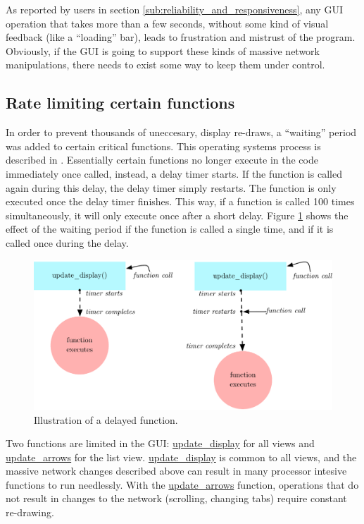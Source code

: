 As reported by users in section \ref{sub:reliability_and_responsiveness}, any GUI operation that takes more than a few seconds, without some kind of visual feedback (like a ``loading'' bar), leads to frustration and mistrust of the program. Obviously, if the GUI is going to support these kinds of massive network manipulations, there needs to exist some way to keep them under control.

	\subsection{Rate limiting certain functions} %
	\label{sub:rate_limiting_certain_functions}

In order to prevent thousands of uneccesary, display re-draws, a ``waiting'' period was added to certain critical functions. This operating systems process is described in . Essentially certain functions no longer execute in the code immediately once called, instead, a delay timer starts. If the function is called again during this delay, the delay timer simply restarts. The function is only executed once the delay timer finishes. This way, if a function is called 100 times simultaneously, it will only execute once after a short delay. Figure \ref{fig:waiting_period} shows the effect of the waiting period if the function is called a single time, and if it is called once during the delay.

\begin{figure}[ht]
	\centering
		\includegraphics[width=1\textwidth]{figures/waiting_period}
		\caption{Illustration of a delayed function.}
		\label{fig:waiting_period}
\end{figure}

Two functions are limited in the GUI: \url{update_display} for all views and \url{update_arrows} for the list view. \url{update_display} is common to all views, and the massive network changes described above can result in many processor intesive functions to run needlessly. With the \url{update_arrows} function, operations that do not result in changes to the network (scrolling, changing tabs) require constant re-drawing.

